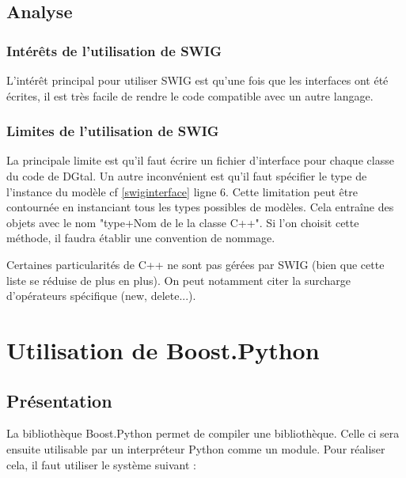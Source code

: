 \documentclass[11pt, french, screen]{report-rd-info}
\begin{document}
\subsection{Analyse}

\subsubsection{Intérêts de l'utilisation de SWIG}

L'intérêt principal pour utiliser SWIG est qu'une fois que les interfaces ont été écrites, il est très facile de rendre le code compatible avec un autre langage.

\subsubsection{Limites de l'utilisation de SWIG}

La principale limite est qu'il faut écrire un fichier d'interface pour chaque classe du code de DGtal. Un autre inconvénient est qu'il faut spécifier le type de l'instance du modèle cf \ref{swiginterface} ligne 6. Cette limitation peut être contournée en instanciant tous les types possibles de modèles. Cela entraîne des objets avec le nom "type+Nom de le la classe C++". Si l'on choisit cette méthode, il faudra établir une convention de nommage.

Certaines particularités de C++ ne sont pas gérées par SWIG (bien que cette liste se réduise de plus en plus). On peut notamment citer la surcharge d'opérateurs spécifique (new, delete...).

\section{Utilisation de Boost.Python}

\subsection{Présentation}

La bibliothèque Boost.Python permet de compiler une bibliothèque. Celle ci sera ensuite utilisable par un interpréteur Python comme un module. Pour réaliser cela, il faut utiliser le système suivant :




\end{document}
